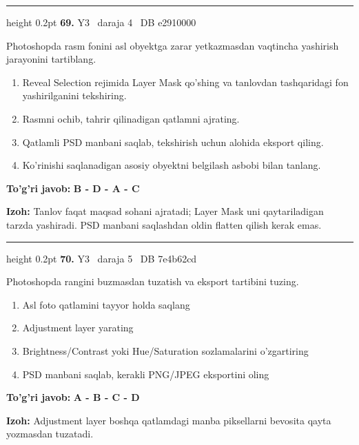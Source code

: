 \documentclass[10pt,a4paper,oneside]{article}
\begin{document}
\vspace{2mm}\hrule height 0.2pt \vspace{4mm}
\hypertarget{q69}{\textbf{\color{ink}69.}}  {\color{muted}\scriptsize Y3 \textbullet\ daraja 4 \textbullet\ DB e2910000}
\par
Photoshopda rasm fonini asl obyektga zarar yetkazmasdan vaqtincha yashirish jarayonini tartiblang.
\begin{enumerate}[label=\Alph*),leftmargin=9mm]
\item Reveal Selection rejimida Layer Mask qo'shing va tanlovdan tashqaridagi fon yashirilganini tekshiring.
\item Rasmni ochib, tahrir qilinadigan qatlamni ajrating.
\item Qatlamli PSD manbani saqlab, tekshirish uchun alohida eksport qiling.
\item Ko'rinishi saqlanadigan asosiy obyektni belgilash asbobi bilan tanlang.
\end{enumerate}
\begin{tcolorbox}[enhanced,breakable,colback=teal!4,colframe=teal!45!black,boxrule=0.45pt,arc=1.2mm,left=2.8mm,right=2.8mm,top=2mm,bottom=2mm,before skip=2mm,after skip=2mm]
\textbf{\color{teal}To'g'ri javob:} \textbf{B - D - A - C}
\par\smallskip
\textbf{Izoh:} Tanlov faqat maqsad sohani ajratadi; Layer Mask uni qaytariladigan tarzda yashiradi. PSD manbani saqlashdan oldin flatten qilish kerak emas.
\end{tcolorbox}
\vspace{2mm}\hrule height 0.2pt \vspace{4mm}
\hypertarget{q70}{\textbf{\color{ink}70.}}  {\color{muted}\scriptsize Y3 \textbullet\ daraja 5 \textbullet\ DB 7e4b62cd}
\par
Photoshopda rangini buzmasdan tuzatish va eksport tartibini tuzing.
\begin{enumerate}[label=\Alph*),leftmargin=9mm]
\item Asl foto qatlamini tayyor holda saqlang
\item Adjustment layer yarating
\item Brightness/Contrast yoki Hue/Saturation sozlamalarini o'zgartiring
\item PSD manbani saqlab, kerakli PNG/JPEG eksportini oling
\end{enumerate}
\begin{tcolorbox}[enhanced,breakable,colback=teal!4,colframe=teal!45!black,boxrule=0.45pt,arc=1.2mm,left=2.8mm,right=2.8mm,top=2mm,bottom=2mm,before skip=2mm,after skip=2mm]
\textbf{\color{teal}To'g'ri javob:} \textbf{A - B - C - D}
\par\smallskip
\textbf{Izoh:} Adjustment layer boshqa qatlamdagi manba piksellarni bevosita qayta yozmasdan tuzatadi.
\end{tcolorbox}
\end{document}
